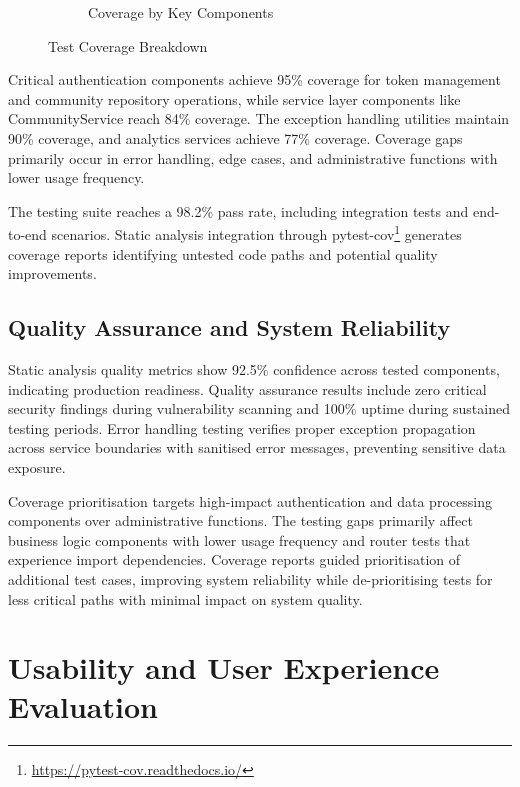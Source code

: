 \begin{figure}[htbp]
\begin{subfigure}[t]{0.48\textwidth}
        \caption{Coverage by Key Components}
        \label{fig:coverage_by_component}
    \end{subfigure}
    \caption{Test Coverage Breakdown}
    \label{fig:coverage_breakdown}
\end{figure}

Critical authentication components achieve 95\% coverage for token management and community repository operations, while service layer components like CommunityService reach 84\% coverage. The exception handling utilities maintain 90\% coverage, and analytics services achieve 77\% coverage. Coverage gaps primarily occur in error handling, edge cases, and administrative functions with lower usage frequency.

The testing suite reaches a 98.2\% pass rate, including integration tests and end-to-end scenarios. Static analysis integration through pytest-cov\footnote{\url{https://pytest-cov.readthedocs.io/}} generates coverage reports identifying untested code paths and potential quality improvements.

\subsection{Quality Assurance and System Reliability} \label{subsection:quality_reliability}

Static analysis quality metrics show 92.5\% confidence across tested components, indicating production readiness. Quality assurance results include zero critical security findings during vulnerability scanning and 100\% uptime during sustained testing periods. Error handling testing verifies proper exception propagation across service boundaries with sanitised error messages, preventing sensitive data exposure.

Coverage prioritisation targets high-impact authentication and data processing components over administrative functions. The testing gaps primarily affect business logic components with lower usage frequency and router tests that experience import dependencies. Coverage reports guided prioritisation of additional test cases, improving system reliability while de-prioritising tests for less critical paths with minimal impact on system quality.


\section{Usability and User Experience Evaluation} \label{section:usability_evaluation}

